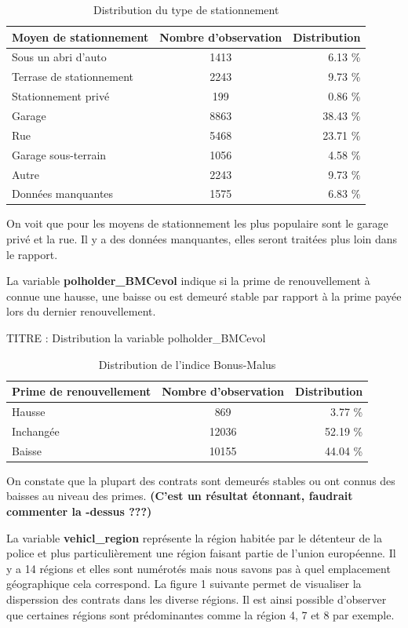 \documentclass[
]{article}
\begin{document}
\begin{table}[ht]
\centering
\caption{Distribution du type de stationnement} 
\label{tbl:policyGarage}
\begin{tabular}{lcr}
  \hline
Moyen de stationnement & Nombre d'observation & Distribution \\ 
  \hline
Sous un abri d'auto & 1413 & 6.13 \% \\ 
  Terrase de stationnement & 2243 & 9.73 \% \\ 
  Stationnement privé & 199 & 0.86 \% \\ 
  Garage & 8863 & 38.43 \% \\ 
  Rue & 5468 & 23.71 \% \\ 
  Garage sous-terrain & 1056 & 4.58 \% \\ 
  Autre & 2243 & 9.73 \% \\ 
  Données manquantes & 1575 & 6.83 \% \\ 
   \hline
\end{tabular}
\end{table}

On voit que pour les moyens de stationnement les plus populaire sont le
garage privé et la rue. Il y a des données manquantes, elles seront
traitées plus loin dans le rapport.

La variable \textbf{polholder\_BMCevol} indique si la prime de
renouvellement à connue une hausse, une baisse ou est demeuré stable par
rapport à la prime payée lors du dernier renouvellement.

TITRE : Distribution la variable polholder\_BMCevol

\begin{table}[ht]
\centering
\caption{Distribution de l'indice Bonus-Malus} 
\label{tbl:policyBM}
\begin{tabular}{lcr}
  \hline
Prime de renouvellement & Nombre d'observation & Distribution \\ 
  \hline
Hausse & 869 & 3.77 \% \\ 
  Inchangée & 12036 & 52.19 \% \\ 
  Baisse & 10155 & 44.04 \% \\ 
   \hline
\end{tabular}
\end{table}

On constate que la plupart des contrats sont demeurés stables ou ont
connus des baisses au niveau des primes. \textbf{(C'est un résultat
étonnant, faudrait commenter la -dessus ???)}

La variable \textbf{vehicl\_region} représente la région habitée par le
détenteur de la police et plus particulièrement une région faisant
partie de l'union européenne. Il y a 14 régions et elles sont numérotés
mais nous savons pas à quel emplacement géographique cela correspond. La
figure 1 suivante permet de visualiser la disperssion des contrats dans
les diverse régions. Il est ainsi possible d'observer que certaines
régions sont prédominantes comme la région 4, 7 et 8 par exemple.
\end{document}
